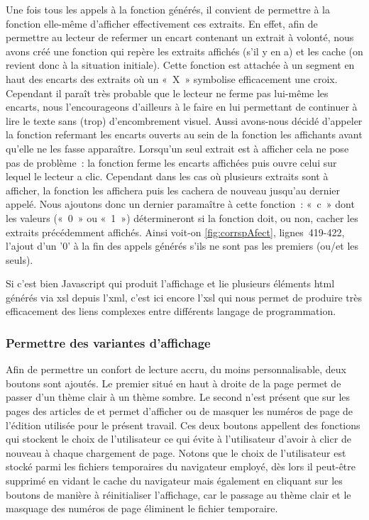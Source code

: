 \documentclass[12pt, a4paper]{article}
\begin{document}

Une fois tous les appels à la fonction générés, il convient de permettre à la fonction elle-même d'afficher effectivement ces extraits. En effet, afin de permettre au lecteur de refermer un encart contenant un extrait à volonté, nous avons créé une fonction qui repère les extraits affichés (s'il y en a) et les cache (on revient donc à la situation initiale). Cette fonction est attachée à un segment en haut des encarts des extraits où un «~X~» symbolise efficacement une croix.
Cependant il paraît très probable que le lecteur ne ferme pas lui-même les encarts, nous l'encourageons d'ailleurs à le faire en lui permettant de continuer à lire le texte sans (trop) d'encombrement visuel. Aussi avons-nous décidé d'appeler la fonction refermant les encarts ouverts au sein de la fonction les affichants avant qu'elle ne les fasse apparaître.
Lorsqu'un seul extrait est à afficher cela ne pose pas de problème~: la fonction ferme les encarts affichées puis ouvre celui sur lequel le lecteur a clic. Cependant dans les cas où plusieurs extraits sont à afficher, la fonction les affichera puis les cachera de nouveau jusqu'au dernier appelé. Nous ajoutons donc un dernier paramaître à cette fonction~: «~c~» dont les valeurs («~0~» ou «~1~») détermineront si la fonction doit, ou non, cacher les extraits précédemment affichés. 
Ainsi voit-on \ref{fig:corrspAfect}, lignes~419-422, l'ajout d'un '0' à la fin des appels générés s'ils ne sont pas les premiers (ou/et les seuls).


Si c'est bien Javascript qui produit l'affichage et lie plusieurs éléments html générés via xsl depuis l'xml, c'est ici encore l'xsl qui nous permet de produire très efficacement des liens complexes entre différents langage de programmation.

\subsubsection{Permettre des variantes d'affichage}

Afin de permettre un confort de lecture accru, du moins personnalisable, deux boutons sont ajoutés. Le premier situé en haut à droite de la page permet de passer d'un thème clair à un thème sombre. Le second n'est présent que sur les pages des articles de \punr{} et permet d'afficher ou de masquer les numéros de page de l'édition utilisée pour le présent travail. Ces deux boutons appellent des fonctions qui stockent le choix de l'utilisateur ce qui évite à l'utilisateur d'avoir à clicr de nouveau à chaque chargement de page. Notons que le choix de l'utilisateur est stocké parmi les fichiers temporaires du navigateur employé, dès lors il peut-être supprimé en vidant le cache du navigateur mais également en cliquant sur les boutons de manière à réinitialiser l'affichage, car le passage au thème clair et le masquage des numéros de page éliminent le fichier temporaire.
\end{document}
